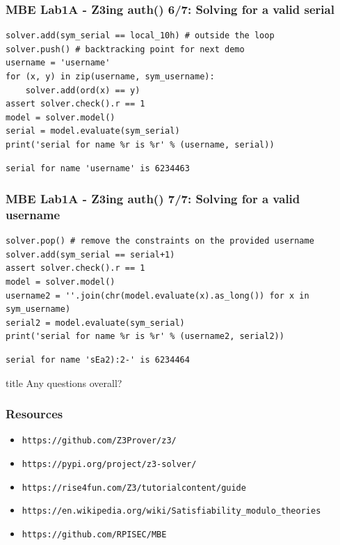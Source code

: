 \documentclass[aspectratio=169]{beamer}
\newcommand{\questionsslide}[1]{
  \begin{frame}
  \vfill
  \centering
  \begin{beamercolorbox}[sep=8pt,center,shadow=true,rounded=true]{title}
    \usebeamerfont{title}Any questions#1?\par%
  \end{beamercolorbox}
  \vfill
  \end{frame}
}
\begin{document}
\begin{frame}[fragile]
\frametitle{MBE Lab1A - Z3ing auth() 6/7: Solving for a valid serial}
\begin{Verbatim}[fontsize=\scriptsize, frame=single]
solver.add(sym_serial == local_10h) # outside the loop
solver.push() # backtracking point for next demo
username = 'username'
for (x, y) in zip(username, sym_username):
    solver.add(ord(x) == y)
assert solver.check().r == 1
model = solver.model()
serial = model.evaluate(sym_serial)
print('serial for name %r is %r' % (username, serial))
\end{Verbatim}
\begin{Verbatim}[fontsize=\scriptsize, frame=single]
serial for name 'username' is 6234463
\end{Verbatim}
\end{frame}


\begin{frame}[fragile]
\frametitle{MBE Lab1A - Z3ing auth() 7/7: Solving for a valid username}
\begin{Verbatim}[fontsize=\scriptsize, frame=single]
solver.pop() # remove the constraints on the provided username
solver.add(sym_serial == serial+1)
assert solver.check().r == 1
model = solver.model()
username2 = ''.join(chr(model.evaluate(x).as_long()) for x in sym_username)
serial2 = model.evaluate(sym_serial)
print('serial for name %r is %r' % (username2, serial2))
\end{Verbatim}
\begin{Verbatim}[fontsize=\scriptsize, frame=single]
serial for name 'sEa2):2-' is 6234464
\end{Verbatim}
\end{frame}

\questionsslide{ overall}

\begin{frame}[fragile]
\frametitle{Resources}
\begin{itemize}
\item \verb|https://github.com/Z3Prover/z3/|
\item \verb|https://pypi.org/project/z3-solver/|
\item \verb|https://rise4fun.com/Z3/tutorialcontent/guide|
\item \verb|https://en.wikipedia.org/wiki/Satisfiability_modulo_theories|
\item \verb|https://github.com/RPISEC/MBE|
\end{itemize}
\end{frame}
\end{document}
